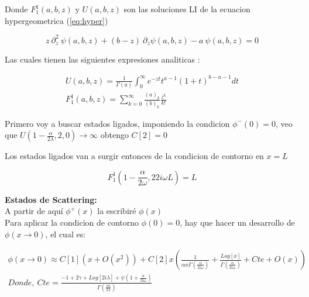 Donde $F _1 ^1(a,b,z)$ y $ U(a,b,z)$ son las soluciones LI de la ecuacion hypergeometrica (\ref{eq:hyper})

\begin{equation}
    z \ \partial ^2 _z \ \psi (a,b,z) + (b-z) \
    \partial _z \psi (a,b,z)
    -a \ \psi (a,b,z) = 0
\label{eq:hyper}
\end{equation}

Las cuales tienen las siguientes expresiones analiticas  : 

\begin{equation}
\begin{array}{c}
	U(a,b,z) = \frac{1}{\Gamma (a)} 
	\int _0 ^{\infty} e ^{-zt}
	t ^{a-1}
	(1+t) ^{b-a-1}
	dt \\
	F _1 ^1 (a,b,z) = \sum _ {k=0} ^{\infty} 
	\frac{(a) _k}{(b) _k} 
	\frac{z ^k}{k!} 
\end{array}
\end{equation}

Primero voy a buscar estados ligados, imponiendo la condicion $\phi ^{-} (0) = 0$, veo que $U(1- \frac{\alpha}{2 \lambda} ,2 ,0) \rightarrow \infty $ obtengo $C[2] = 0$

Los estados ligados van a surgir entonces de la condicion de contorno en $x=L$

\begin{equation}
	F _1 ^{1} (1- \frac{\alpha}{2 \omega} , 2 2 i \omega L ) = L 
\end{equation}


\textbf{Estados de Scattering:} \\
    A partir de aquí $\phi ^{+} (x)$ la escribiré $\phi (x)$ \\


Para aplicar la condicion de contorno $\phi (0) = 0$, hay que hacer un desarrollo de $\phi(x \rightarrow 0)$, el cual es:

\begin{equation}
\begin{array}{c}
\phi (x \rightarrow 0) \approx
C[1] ( x + O(x ^2)) + 
C[2] x 
\left( 
\frac{1}{  \alpha x  \Gamma ( \frac{ \alpha}{2 i \omega}  )   }  +
\frac{Log[x] }{\Gamma ( \frac{ \alpha}{2 i \omega} ) } + Cte + O(x)
\right)
\\
Donde,  \ Cte = 
\frac{
-1 + 2 \gamma + Log[2 i \lambda] + \psi (1 + \frac{ \alpha}{2 i \omega})
}
{\Gamma (\frac{i \alpha}{2 \lambda})}
\end{array}
\label{eq.scat}
\end{equation}

